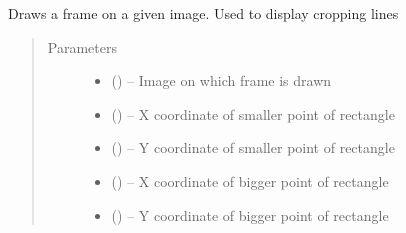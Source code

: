 \documentclass[letterpaper,10pt,english]{sphinxmanual}
\begin{document}
\begin{fulllineitems}
\label{\detokenize{image_helpers:image_helpers.draw_frame}}
Draws a frame on a given image.
Used to display cropping lines
\begin{quote}\begin{description}
\item[{Parameters}] \leavevmode\begin{itemize}
\item {} 
 () -- Image on which frame is drawn

\item {} 
 () -- X coordinate of smaller point of rectangle

\item {} 
 () -- Y coordinate of smaller point of rectangle

\item {} 
 () -- X coordinate of bigger point of rectangle

\item {} 
 () -- Y coordinate of bigger point of rectangle

\end{itemize}

\end{description}\end{quote}

\end{fulllineitems}

\end{document}
